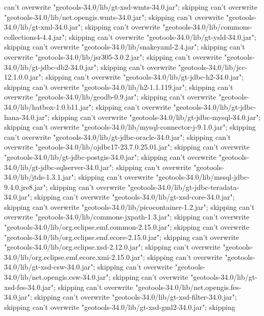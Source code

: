     can't overwrite "geotools-34.0/lib/gt-xsd-wmts-34.0.jar"; skipping
    can't overwrite "geotools-34.0/lib/net.opengis.wmts-34.0.jar"; skipping
    can't overwrite "geotools-34.0/lib/gt-xml-34.0.jar"; skipping
    can't overwrite "geotools-34.0/lib/commons-collections4-4.4.jar"; skipping
    can't overwrite "geotools-34.0/lib/gt-ysld-34.0.jar"; skipping
    can't overwrite "geotools-34.0/lib/snakeyaml-2.4.jar"; skipping
    can't overwrite "geotools-34.0/lib/jsr305-3.0.2.jar"; skipping
    can't overwrite "geotools-34.0/lib/gt-jdbc-db2-34.0.jar"; skipping
    can't overwrite "geotools-34.0/lib/jcc-12.1.0.0.jar"; skipping
    can't overwrite "geotools-34.0/lib/gt-jdbc-h2-34.0.jar"; skipping
    can't overwrite "geotools-34.0/lib/h2-1.1.119.jar"; skipping
    can't overwrite "geotools-34.0/lib/geodb-0.9.jar"; skipping
    can't overwrite "geotools-34.0/lib/hatbox-1.0.b11.jar"; skipping
    can't overwrite "geotools-34.0/lib/gt-jdbc-hana-34.0.jar"; skipping
    can't overwrite "geotools-34.0/lib/gt-jdbc-mysql-34.0.jar"; skipping
    can't overwrite "geotools-34.0/lib/mysql-connector-j-9.1.0.jar"; skipping
    can't overwrite "geotools-34.0/lib/gt-jdbc-oracle-34.0.jar"; skipping
    can't overwrite "geotools-34.0/lib/ojdbc17-23.7.0.25.01.jar"; skipping
    can't overwrite "geotools-34.0/lib/gt-jdbc-postgis-34.0.jar"; skipping
    can't overwrite "geotools-34.0/lib/gt-jdbc-sqlserver-34.0.jar"; skipping
    can't overwrite "geotools-34.0/lib/jtds-1.3.1.jar"; skipping
    can't overwrite "geotools-34.0/lib/mssql-jdbc-9.4.0.jre8.jar"; skipping
    can't overwrite "geotools-34.0/lib/gt-jdbc-teradata-34.0.jar"; skipping
    can't overwrite "geotools-34.0/lib/gt-xsd-core-34.0.jar"; skipping
    can't overwrite "geotools-34.0/lib/picocontainer-1.2.jar"; skipping
    can't overwrite "geotools-34.0/lib/commons-jxpath-1.3.jar"; skipping
    can't overwrite "geotools-34.0/lib/org.eclipse.emf.common-2.15.0.jar"; skipping
    can't overwrite "geotools-34.0/lib/org.eclipse.emf.ecore-2.15.0.jar"; skipping
    can't overwrite "geotools-34.0/lib/org.eclipse.xsd-2.12.0.jar"; skipping
    can't overwrite "geotools-34.0/lib/org.eclipse.emf.ecore.xmi-2.15.0.jar"; skipping
    can't overwrite "geotools-34.0/lib/gt-xsd-csw-34.0.jar"; skipping
    can't overwrite "geotools-34.0/lib/net.opengis.csw-34.0.jar"; skipping
    can't overwrite "geotools-34.0/lib/gt-xsd-fes-34.0.jar"; skipping
    can't overwrite "geotools-34.0/lib/net.opengis.fes-34.0.jar"; skipping
    can't overwrite "geotools-34.0/lib/gt-xsd-filter-34.0.jar"; skipping
    can't overwrite "geotools-34.0/lib/gt-xsd-gml2-34.0.jar"; skipping
